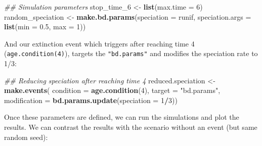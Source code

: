 \documentclass[
]{book}
\newenvironment{Shaded}{\begin{snugshade}}{\end{snugshade}}
\newcommand{\CommentTok}[1]{\textcolor[rgb]{0.56,0.35,0.01}{\textit{#1}}}
\newcommand{\DataTypeTok}[1]{\textcolor[rgb]{0.13,0.29,0.53}{#1}}
\newcommand{\DecValTok}[1]{\textcolor[rgb]{0.00,0.00,0.81}{#1}}
\newcommand{\FloatTok}[1]{\textcolor[rgb]{0.00,0.00,0.81}{#1}}
\newcommand{\KeywordTok}[1]{\textcolor[rgb]{0.13,0.29,0.53}{\textbf{#1}}}
\newcommand{\NormalTok}[1]{#1}
\newcommand{\OperatorTok}[1]{\textcolor[rgb]{0.81,0.36,0.00}{\textbf{#1}}}
\newcommand{\StringTok}[1]{\textcolor[rgb]{0.31,0.60,0.02}{#1}}
\begin{document}
\begin{Shaded}
\begin{Highlighting}[]
\CommentTok{\#\# Simulation parameters}
\NormalTok{stop\_time\_}\DecValTok{6}\NormalTok{ \textless{}{-}}\StringTok{ }\KeywordTok{list}\NormalTok{(}\DataTypeTok{max.time =} \DecValTok{6}\NormalTok{)}
\NormalTok{random\_speciation \textless{}{-}}\StringTok{ }\KeywordTok{make.bd.params}\NormalTok{(}\DataTypeTok{speciation =}\NormalTok{ runif, }
                                    \DataTypeTok{speciation.args =} \KeywordTok{list}\NormalTok{(}\DataTypeTok{min =} \FloatTok{0.5}\NormalTok{, }\DataTypeTok{max =} \DecValTok{1}\NormalTok{))}
\end{Highlighting}
\end{Shaded}

And our extinction event which triggers after reaching time 4 (\texttt{age.condition(4)}), targets the \texttt{"bd.params"} and modifies the speciation rate to 1/3:

\begin{Shaded}
\begin{Highlighting}[]
\CommentTok{\#\# Reducing speciation after reaching time 4}
\NormalTok{reduced.speciation \textless{}{-}}\StringTok{ }\KeywordTok{make.events}\NormalTok{(}
                      \DataTypeTok{condition =} \KeywordTok{age.condition}\NormalTok{(}\DecValTok{4}\NormalTok{),}
                      \DataTypeTok{target =} \StringTok{"bd.params"}\NormalTok{,}
                      \DataTypeTok{modification =} \KeywordTok{bd.params.update}\NormalTok{(}\DataTypeTok{speciation =} \DecValTok{1}\OperatorTok{/}\DecValTok{3}\NormalTok{))}
\end{Highlighting}
\end{Shaded}

Once these parameters are defined, we can run the simulations and plot the results.
We can contrast the results with the scenario without an event (but same random seed):
\end{document}

